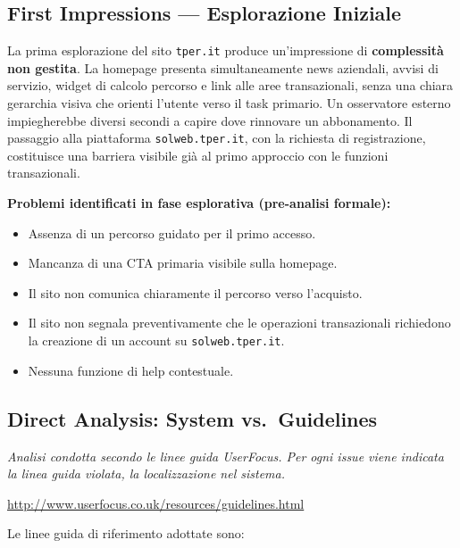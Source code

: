 ﻿\documentclass[11pt,a4paper]{article}
\begin{document}
\subsection*{First Impressions — Esplorazione Iniziale}

\noindent La prima esplorazione del sito \texttt{tper.it} produce
un'impressione di \textbf{complessità non gestita}. La homepage presenta
simultaneamente news aziendali, avvisi di servizio, widget di calcolo
percorso e link alle aree transazionali, senza una chiara gerarchia
visiva che orienti l'utente verso il task primario. Un osservatore
esterno impiegherebbe diversi secondi a capire dove rinnovare un
abbonamento. Il passaggio alla piattaforma \texttt{solweb.tper.it},
con la richiesta di registrazione, costituisce una barriera visibile
già al primo approccio con le funzioni transazionali.

\noindent\textbf{Problemi identificati in fase esplorativa (pre-analisi formale):}

\begin{itemize}
    \item Assenza di un percorso guidato per il primo accesso.
    \item Mancanza di una CTA primaria visibile sulla homepage.
    \item Il sito non comunica chiaramente il percorso verso l’acquisto.
    \item Il sito non segnala preventivamente che le operazioni
    transazionali richiedono la creazione di un account su
    \texttt{solweb.tper.it}.
    \item Nessuna funzione di help contestuale.
\end{itemize}

\subsection*{Direct Analysis: System vs.\ Guidelines}

\noindent\textit{Analisi condotta secondo le linee guida UserFocus. Per ogni issue viene indicata la linea guida violata, la localizzazione nel sistema.}\\[2pt]
\raggedright\url{http://www.userfocus.co.uk/resources/guidelines.html}\par

\bigskip

\noindent Le linee guida di riferimento adottate sono:
\end{document}
